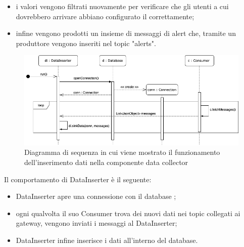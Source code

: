 \begin{landscape}
\begin{itemize}
				\item i valori vengono filtrati nuovamente per verificare che gli utenti a cui dovrebbero arrivare abbiano configurato il  correttamente;
				\item infine vengono prodotti un insieme di messaggi di alert che, tramite un produttore vengono inseriti nel topic  "alerts". 
			\end{itemize}
			\begin{figure}[H]
				\centering
				\includegraphics[scale=0.550]{res/images/DATACOLLECTOR/DataInserter.ThreadsKafkaDataCollector.png}
				\caption{Diagramma di sequenza in cui viene mostrato il funzionamento dell'inserimento dati nella componente data collector}
				\label{Diagramma 8}
			\end{figure}
			Il comportamento di DataInserter è il seguente:
			\begin{itemize}
				\item DataInserter apre una connessione con il database ;
				\item ogni qualvolta il suo Consumer trova dei nuovi dati nei topic collegati ai gateway, vengono inviati i messaggi al DataInserter;
				\item DataInserter infine inserisce i dati all'interno del database.
			\end{itemize}
	\end{landscape}